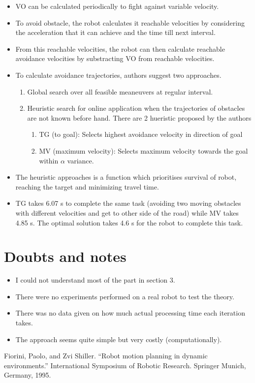 \documentclass[12pt]{article}
\begin{document}
\begin{itemize}
    \item VO can be calculated periodically to fight against variable velocity.
    \item To avoid obstacle, the robot calculates it reachable velocities by considering the acceleration that it can achieve and the time till next interval.
    \item From this reachable velocities, the robot can then calculate reachable avoidance velocities by substracting VO from reachable velocities.
    \item To calculate avoidance trajectories, authors suggest two approaches. 
        \begin{enumerate}
            \item Global search over all feasible meaneuvers at regular interval.
            \item Heuristic search for online application when the trajectories of obstacles are not known before hand. There are 2 hueristic proposed by the authors
                \begin{enumerate}
                    \item TG (to goal): Selects highest avoidance velocity in direction of goal
                    \item MV (maximum velocity): Selects maximum velocity towards the goal within $\alpha$ variance. 
                \end{enumerate}
        \end{enumerate}
    \item The heuristic approaches is a function which prioritises survival of robot, reaching the target and minimizing travel time.
    \item TG takes 6.07 s to complete the same task (avoiding two moving obstacles with different velocities and get to other side of the road) while MV takes 4.85 s. The optimal solution takes 4.6 s for the robot to complete this task.
\end{itemize}
\section{Doubts and notes}
\begin{itemize}
    \item I could not understand most of the part in section 3.
    \item There were no experiments performed on a real robot to test the theory.
    \item There was no data given on how much actual processing time each iteration takes.
    \item The approach seems quite simple but very costly (computationally).
\end{itemize}
\begin{thebibliography}{1}
     Fiorini, Paolo, and Zvi Shiller. ``Robot motion planning in dynamic environments.'' International Symposium of Robotic Research. Springer Munich, Germany, 1995.
\end{thebibliography}
\end{document}
